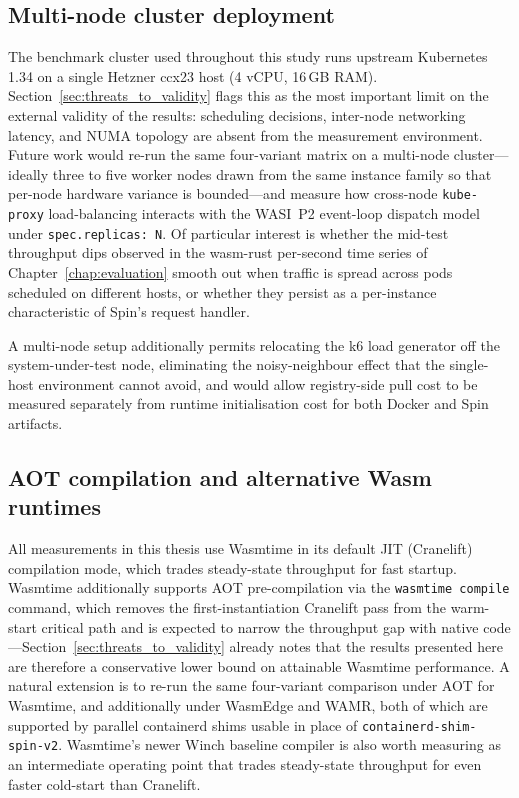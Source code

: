 \subsection{Multi-node cluster deployment}
\label{sec:future_work_multinode}

\begin{sloppypar}
The benchmark cluster used throughout this study runs upstream Kubernetes 1.34 on a single Hetzner ccx23 host (4 vCPU, 16\,GB \acs{RAM}). Section~\ref{sec:threats_to_validity} flags this as the most important limit on the external validity of the results: scheduling decisions, inter-node networking latency, and NUMA topology are absent from the measurement environment. Future work would re-run the same four-variant matrix on a multi-node cluster---ideally three to five worker nodes drawn from the same instance family so that per-node hardware variance is bounded---and measure how cross-node \texttt{kube-proxy} load-balancing interacts with the \acs{WASI}~P2 event-loop dispatch model under \texttt{spec.replicas:~N}. Of particular interest is whether the mid-test throughput dips observed in the wasm-rust per-second time series of Chapter~\ref{chap:evaluation} smooth out when traffic is spread across pods scheduled on different hosts, or whether they persist as a per-instance characteristic of Spin's request handler.
\end{sloppypar}

A multi-node setup additionally permits relocating the k6 load generator off the system-under-test node, eliminating the noisy-neighbour effect that the single-host environment cannot avoid, and would allow registry-side pull cost to be measured separately from runtime initialisation cost for both Docker and Spin artifacts.

\subsection{AOT compilation and alternative Wasm runtimes}
\label{sec:future_work_aot}

\begin{sloppypar}
All measurements in this thesis use Wasmtime in its default \acs{JIT} (Cranelift) compilation mode, which trades steady-state throughput for fast startup. Wasmtime additionally supports \acs{AOT} pre-compilation via the \texttt{wasmtime compile} command, which removes the first-instantiation Cranelift pass from the warm-start critical path and is expected to narrow the throughput gap with native code---Section~\ref{sec:threats_to_validity} already notes that the results presented here are therefore a conservative lower bound on attainable Wasmtime performance. A natural extension is to re-run the same four-variant comparison under \acs{AOT} for Wasmtime, and additionally under WasmEdge and \acs{WAMR}, both of which are supported by parallel containerd shims usable in place of \texttt{containerd-shim-spin-v2}. Wasmtime's newer Winch baseline compiler is also worth measuring as an intermediate operating point that trades steady-state throughput for even faster cold-start than Cranelift.
\end{sloppypar}

